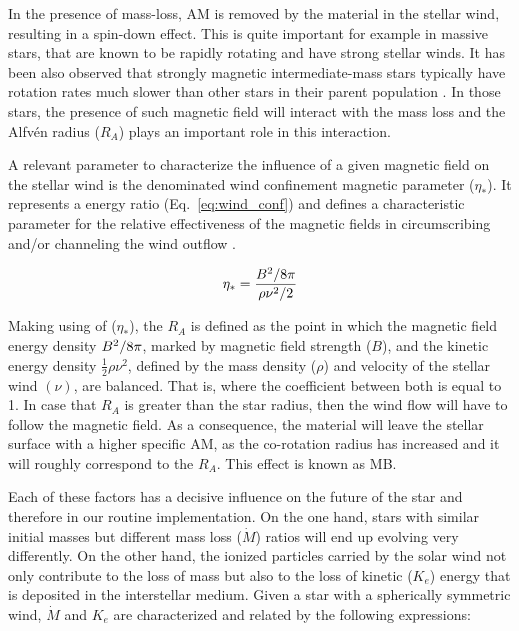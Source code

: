 \documentclass[fleqn,usenatbib]{mnras}
\begin{document}
In the presence of mass-loss, AM is removed by the material in the stellar wind, resulting in a spin-down effect. This is quite important for example in massive stars, that are known to be rapidly rotating and have strong stellar winds. It has been also observed that strongly magnetic intermediate-mass stars typically have rotation rates much slower than other stars in their parent population \citep{Mathys2006}. In those stars, the presence of such magnetic field will interact with the mass loss and the Alfv\'{e}n radius ($R_{A}$) plays an important role in this interaction.\par

A relevant parameter to characterize the influence of a given magnetic field on the stellar wind is the denominated wind confinement magnetic parameter ($\eta_*$). It represents a energy ratio (Eq.~\ref{eq:wind_conf}) and defines a characteristic parameter for the relative effectiveness of the magnetic fields in circumscribing and/or channeling the wind outflow \citep{UdDoula2002}.\par

\begin{ceqn}
\begin{equation}
    \eta_* = \frac{B^{2}/8\pi}{\rho\nu^2/2} \label{eq:wind_conf}
\end{equation}
\end{ceqn}

Making using of ($\eta_*$), the $R_{A}$ is defined as the point in which the magnetic field energy density $B^{2}/8\pi$, marked by magnetic field strength ($B$), and the kinetic energy density $\frac{1}{2}\rho\nu^{2}$, defined by the mass density ($\rho$) and velocity of the stellar wind $(\nu)$, are balanced. That is, where the coefficient between both is equal to 1. In case that $R_{A}$ is greater than the star radius, then the wind flow will have to follow the magnetic field. As a consequence, the material will leave the stellar surface with a higher specific AM, as the co-rotation radius has increased and it will roughly correspond to the $R_{A}$. This effect is known as MB.\par


Each of these factors has a decisive influence on the future of the star and therefore in our routine implementation. On the one hand, stars with similar initial masses but different mass loss ($\Dot{M}$) ratios will end up evolving very differently. On the other hand, the ionized particles carried by the solar wind not only contribute to the loss of mass but also to the loss of kinetic ($K_e$) energy that is deposited in the interstellar medium. Given a star with a spherically symmetric wind, $\Dot{M}$ and $K_e$ are characterized and related by the following expressions:
\end{document}
